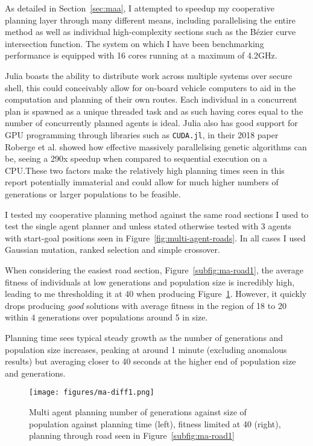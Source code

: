 As detailed in Section~\ref{sec:maa}, I attempted to speedup my cooperative planning layer through many different means, including parallelising the entire method as well as individual high-complexity sections such as the Bézier curve intersection function. The system on which I have been benchmarking performance is equipped with 16 cores running at a maximum of 4.2GHz.

Julia boasts the ability to distribute work across multiple systems over secure shell, this could conceivably allow for on-board vehicle computers to aid in the computation and planning of their own routes. Each individual in a concurrent plan is spawned as a unique threaded task and as such having cores equal to the number of concurrently planned agents is ideal. Julia also has good support for GPU programming through libraries such as \texttt{CUDA.jl}\cite{besard2018juliagpu}, in their 2018 paper Roberge et al.\cite{robergeFastGeneticAlgorithm2018} showed how effective massively parallelising genetic algorithms can be, seeing a 290x speedup when compared to sequential execution on a CPU.\@ These two factors make the relatively high planning times seen in this report potentially immaterial and could allow for much higher numbers of generations or larger populations to be feasible.

I tested my cooperative planning method against the same road sections I used to test the single agent planner and unless stated otherwise tested with 3 agents with start-goal positions seen in Figure~\ref{fig:multi-agent-roads}. In all cases I used Gaussian mutation, ranked selection and simple crossover.

When considering the easiest road section, Figure~\ref{subfig:ma-road1}, the average fitness of individuals at low generations and population size is incredibly high, leading to me thresholding it at 40 when producing Figure~\ref{fig:ma-diff1-lim40}. However, it quickly drops producing \textit{good} solutions with average fitness in the region of 18 to 20 within 4 generations over populations around 5 in size.

Planning time sees typical steady growth as the number of generations and population size increases, peaking at around 1 minute (excluding anomalous results) but averaging closer to 40 seconds at the higher end of population size and generations.

\begin{figure}[ht]
  \centering
  \texttt{[image: figures/ma-diff1.png]}
  \caption{\label{fig:ma-diff1-lim40} Multi agent planning number of generations against size of population against planning time (left), fitness limited at 40 (right), planning through road seen in Figure~\ref{subfig:ma-road1}}
\end{figure}

